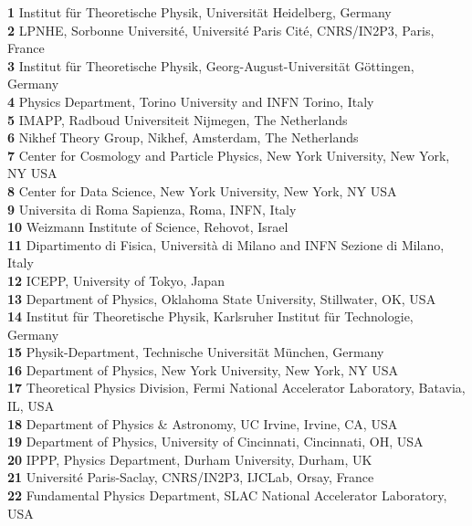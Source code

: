 \documentclass[submission,Phys]{SciPost}
\begin{document}
\begin{center}
{\bf 1} Institut f\"ur Theoretische Physik, Universit\"at Heidelberg, Germany\\
{\bf 2} LPNHE, Sorbonne Universit\'e, Universit\'e Paris Cit\'e, CNRS/IN2P3, Paris, France \\
{\bf 3} Institut f\"ur Theoretische Physik, Georg-August-Universit\"at G\"ottingen, Germany \\
{\bf 4} Physics Department, Torino University and INFN Torino, Italy \\
{\bf 5} IMAPP, Radboud Universiteit Nijmegen, The Netherlands \\
{\bf 6} Nikhef Theory Group, Nikhef, Amsterdam, The Netherlands \\
{\bf 7} Center for Cosmology and Particle Physics, New York University, New York, NY USA \\
{\bf 8} Center for Data Science, New York University, New York, NY USA \\
{\bf 9} Universita di Roma Sapienza, Roma, INFN, Italy \\
{\bf 10} Weizmann Institute of Science, Rehovot, Israel\\
{\bf 11} Dipartimento di Fisica, Universit\`a di Milano  and INFN Sezione di Milano, Italy\\ 
{\bf 12} ICEPP, University of Tokyo, Japan \\
{\bf 13} Department of Physics, Oklahoma State University, Stillwater, OK, USA\\
{\bf 14} Institut f\"ur Theoretische Physik, Karlsruher Institut f\"ur Technologie, Germany\\
{\bf 15} Physik-Department, Technische Universit\"at M\"unchen, Germany\\
{\bf 16} Department of Physics, New York University, New York, NY USA \\
{\bf 17} Theoretical Physics Division, Fermi National Accelerator Laboratory, Batavia, IL, USA 
\\
{\bf 18} Department of Physics \& Astronomy, UC Irvine, Irvine, CA, USA\\
{\bf 19} Department of Physics, University of Cincinnati, Cincinnati, OH, USA \\
{\bf 20} IPPP, Physics Department, Durham University, Durham, UK\\ 
{\bf 21} Universit\'e Paris-Saclay, CNRS/IN2P3, IJCLab, Orsay, France \\
{\bf 22} Fundamental Physics Department, SLAC National Accelerator Laboratory, USA\\

\end{center}
\end{document}
